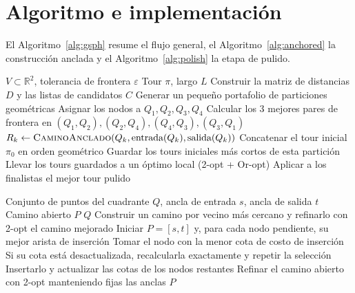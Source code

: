\documentclass[runningheads]{llncs}
\begin{document}
\section{Algoritmo e implementación}
\label{sec:algorithm}

El Algoritmo~\ref{alg:gsph} resume el flujo general, el
Algoritmo~\ref{alg:anchored} la construcción anclada y el
Algoritmo~\ref{alg:polish} la etapa de pulido.

\begin{algorithm}
\caption{GSPH-FC --- procedimiento principal}
\label{alg:gsph}
\begin{algorithmic}[1]
\Require $V\subset\mathbb{R}^2$, tolerancia de frontera $\varepsilon$
\Ensure Tour $\pi$, largo $L$
\State Construir la matriz de distancias $D$ y las listas de candidatos $C$
\State Generar un pequeño portafolio de particiones geométricas
  \State Asignar los nodos a $Q_1,Q_2,Q_3,Q_4$
  \State Calcular los 3 mejores pares de frontera en
         $(Q_1,Q_2),(Q_2,Q_4),(Q_4,Q_3),(Q_3,Q_1)$
      \State $R_k\gets\Call{CaminoAnclado}{Q_k,\text{entrada}(Q_k),\text{salida}(Q_k)}$
    \EndFor
    \State Concatenar el tour inicial $\pi_0$ en orden geométrico
  \EndFor
  \State Guardar los tours iniciales más cortos de esta partición
\EndFor
\State Llevar los tours guardados a un óptimo local (2-opt + Or-opt)
\State Aplicar  a los finalistas
\State \Return el mejor tour pulido
\end{algorithmic}
\end{algorithm}

\begin{algorithm}
\caption{\textsc{CaminoAnclado} --- construcción anclada dentro de un cuadrante}
\label{alg:anchored}
\begin{algorithmic}[1]
\Require Conjunto de puntos del cuadrante $Q$, ancla de entrada $s$, ancla de salida $t$
\Ensure Camino abierto $P$
  \State \Return $Q$
\EndIf
{}
  \State Construir un camino por vecino más cercano y refinarlo con 2-opt
  \State \Return el camino mejorado
\EndIf
\State Iniciar $P=[s,t]$ y, para cada nodo pendiente, su mejor arista de inserción
  \State Tomar el nodo con la menor cota de costo de inserción
  \State Si su cota está desactualizada, recalcularla exactamente y repetir la selección
  \State Insertarlo y actualizar las cotas de los nodos restantes
\EndWhile
\State Refinar el camino abierto con 2-opt manteniendo fijas las anclas
\State \Return $P$
\end{algorithmic}
\end{algorithm}
\end{document}
